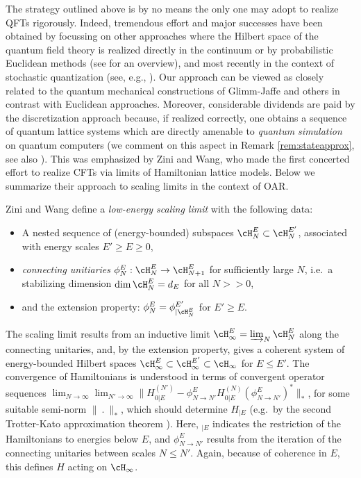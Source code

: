 \documentclass[a4paper, 11pt]{article}
\DeclareMathOperator{\1}{\mathds{1}}
\begin{document}
The strategy outlined above is by no means the only one may adopt to realize QFTs rigorously. Indeed, tremendous effort and major successes have been obtained by focussing on other approaches where the Hilbert space of the quantum field theory is realized directly in the continuum or by probabilistic Euclidean methods (see \cite{SummersAPerspectiveOn} for an overview), and most recently in the context of stochastic quantization (see, e.g., \cite{GubinelliAPDEConstruction, HairerATheoryOf}). Our approach can be viewed as closely related to the quantum mechanical constructions of Glimm-Jaffe and others \cite{GlimmJaffe1, GlimmJaffe2, GlimmQuantumFieldTheory} in contrast with Euclidean approaches. Moreover, considerable dividends are paid by the discretization approach because, if realized correctly, one obtains a sequence of quantum lattice systems which are directly amenable to \emph{quantum simulation} on quantum computers (we comment on this aspect in Remark \ref{rem:stateapprox}, see also \cite{OsborneCFTsim}). This was emphasized by Zini and Wang, who made the first concerted effort to realize CFTs via limits of Hamiltonian lattice models. Below we summarize their approach to scaling limits in the context of OAR.

\bigskip

Zini and Wang \cite{ZiniConformalFieldTheories} define a \emph{low-energy scaling limit} with the following data:
\begin{itemize}
	\item A nested sequence of (energy-bounded) subspaces $\cH^{E}_{N}\subset\cH^{E'}_{N}$, associated with energy scales $E'\geq E\geq0$,
	\item \emph{connecting unitiaries} $\phi^{E}_{N}:\cH^{E}_{N}\rightarrow\cH^{E}_{N+1}$ for sufficiently large $N$, i.e.~a stabilizing dimension $\dim\cH^{E}_{N} = d_{E}$ for all $N>>0$,
	\item and the extension property: $\phi^{E}_{N} = \phi^{E'}_{|\cH^{E}_{N}}$ for $E'\geq E$.
\end{itemize}
The scaling limit results from an inductive limit $\cH^{E}_{\infty}=\varinjlim_{N}\cH^{E}_{N}$ along the connecting unitaries, and, by the extension property, gives a coherent system of energy-bounded Hilbert spaces $\cH^{E}_{\infty}\subset\cH^{E'}_{\infty}\subset\cH_{\infty}$ for $E\leq E'$. The convergence of Hamiltonians is understood in terms of convergent operator sequences $\lim_{N\rightarrow\infty}\lim_{N'\rightarrow\infty}\|H^{(N')}_{0|E}-\phi^{E}_{N\rightarrow N'}H^{(N)}_{0|E}(\phi^{E}_{N\rightarrow N'})^{*}\|_{*}$, for some suitable semi-norm $\|\!\ .\!\ \|_{*}$, which should determine $H_{|E}$ (e.g.~by the second Trotter-Kato approximation theorem \cite{ReedMethodsOfModern1}). Here, $_{|E}$ indicates the restriction of the Hamiltonians to energies below $E$, and $\phi^{E}_{N\rightarrow N'}$ results from the iteration of the connecting unitaries between scales $N\leq N'$. Again, because of coherence in $E$, this defines $H$ acting on $\cH_{\infty}$.
\end{document}
